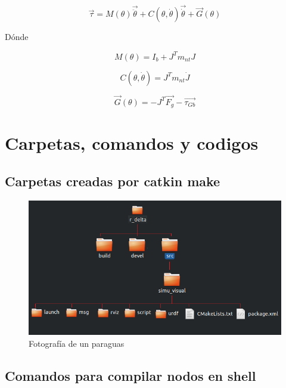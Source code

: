                  \[ \overrightarrow{ \tau}=M \left(  \theta  \right) \overrightarrow{\ddot{ \theta }}+C \left(  \theta ,\dot{ \theta } \right) \overrightarrow{\dot{ \theta }}+ \overrightarrow{G} \left(  \theta  \right)  \] 
                
                Dónde
                
                 \[ M \left(  \theta  \right) =I_{b}+J^{T} m_{nt} J \] 
                
                 \[ C \left(  \theta ,\dot{ \theta } \right) =J^{T} m_{nt}\dot{J} \] 
                
                 \[ \overrightarrow{G} \left(  \theta  \right) =- J^{T}\overrightarrow{F_{g}}-\overrightarrow{ \tau_{Gb}} \] 
         \newpage



        
\chapter{Carpetas, comandos y codigos}\label{anexoC}
\thispagestyle{fancy}
    \section{Carpetas creadas por catkin make}
        \begin{figure}[H]
              \centering
	          \includegraphics[width=1.0\linewidth]{Back/image_anexo/catkin_make.png}
              \caption{Fotografía de un paraguas}
              \label{f:Cap4_Metodo_B_Modelacion_Dinamica_2}
        \end{figure}
    \newpage

    \section{Comandos para compilar nodos en shell}
    
